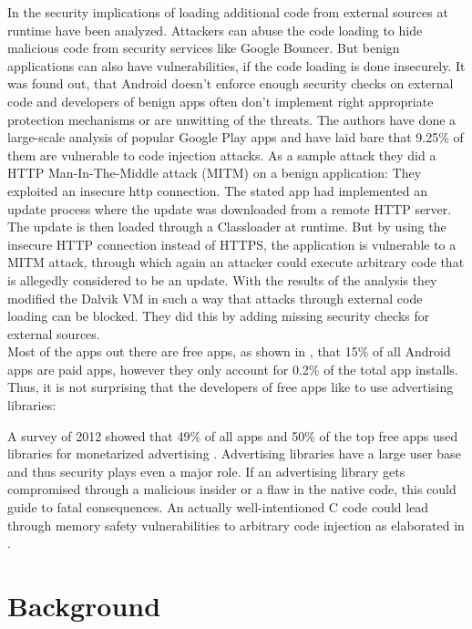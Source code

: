 In \cite{ExecuteThis} the security implications of loading additional code from external sources at runtime have been analyzed. Attackers can abuse the code loading to hide malicious code from security services like Google Bouncer. But benign applications can also have vulnerabilities, if the code loading is done insecurely. It was found out, that Android doesn't enforce enough security checks on external code and developers of benign apps often don't implement right appropriate protection mechanisms or are unwitting of the threats. The authors have done a large-scale analysis of popular Google Play apps and have laid bare that 9.25\% of them are vulnerable to code injection attacks. As a sample attack they did a HTTP Man-In-The-Middle attack (MITM) on a benign application:
They exploited an insecure http connection. The stated app had implemented an update process where the update was downloaded from a remote HTTP server. The update is then loaded through a Classloader at runtime. But by using the insecure HTTP connection instead of HTTPS, the application is vulnerable to a MITM attack, through which again an attacker could execute arbitrary code that is allegedly considered to be an update.
With the results of the analysis they modified the Dalvik VM in such a way that attacks through external code loading can be blocked. They did this by adding missing security checks for external sources.\\

Most of the apps out there are free apps, as shown in \cite[p. 164]{Wang:2017:ESM:3038912.3052712}, that 15\% of all Android apps are paid apps, however they only account for 0.2\% of the total app installs. 
Thus, it is not surprising that the developers of free apps like to use advertising libraries: 

A survey of 2012 showed that 49\% of all apps and 50\% of the top free apps used libraries for monetarized advertising \cite[p.7]{Pearce:2012:APS:2414456.2414498}. 
Advertising libraries have a large user base and thus security plays even a major role. 
If an advertising library gets compromised through a malicious insider or a flaw in the native code, this could guide to fatal consequences. 
An actually well-intentioned C code could lead through memory safety vulnerabilities to arbitrary code injection as elaborated in \cite{Szekeres:2013:SEW:2497621.2498101}.

\section{Background}


